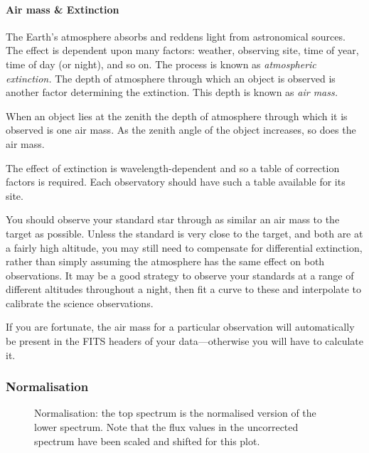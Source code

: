 \documentclass[twoside,11pt]{article}
\newcommand{\xlabel}[1]{}
\newcommand{\mlabel}[1]{\xlabel{#1}\label{#1}}
\newcommand{\scspec}[2]{#1}
\newcommand{\scspec}[2]{#2}
\begin{document}
\paragraph{\mlabel{airmass}Air mass \& Extinction}

The Earth's atmosphere absorbs and reddens light from astronomical sources.
The effect is dependent upon many factors: weather, observing site, time of
year, time of day (or night), and so on.
The process is known as {\sl atmospheric extinction.}
The depth of atmosphere through which an object is
observed is another factor determining the extinction.
This depth is known as {\sl air mass.}

When an object lies at the zenith the depth of atmosphere
through which it is observed is one air mass.
As the zenith angle of the object increases, so does the air mass.

The effect of extinction is wavelength-dependent and so a table of
correction factors is required.
Each observatory should have such a table available for its site.

You should observe your standard star through as similar an air mass
to the target as possible.  Unless the standard is very close to the
target, and both are at a fairly high altitude, you may still need to
compensate for differential extinction, rather than simply assuming the
atmosphere has the same effect on both observations.  It may be a good
strategy to observe your standards at a range of different altitudes
throughout a night, then fit a curve to these and interpolate to
calibrate the science observations.

If you are fortunate, the air mass for a particular observation will
automatically be present in the FITS headers of your
data\scspec{---}{ - }otherwise you will have to calculate it.


\subsubsection{\mlabel{normalisation}Normalisation}

\begin{figure}
\begin{center}
  \scspec{\leavevmode\epsfysize=105mm\epsfbox{sc7_09.eps}}
         {\leavevmode\epsfysize=136mm}

  \parbox{140mm}{
    \caption{Normalisation: the top spectrum is the normalised version
             of the lower spectrum.  Note that the flux values in the
	     uncorrected spectrum have been scaled and shifted for
	     this plot.}
    \label{fi_normalise}
  }
\end{center}
\end{figure}
\end{document}
